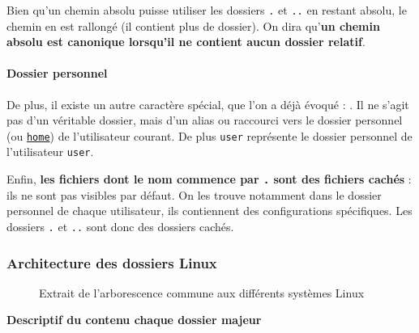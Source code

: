  Bien qu'un chemin absolu puisse utiliser les dossiers \texttt{.} et \texttt{..} en restant absolu, le chemin en est rallongé (il contient plus de dossier). On dira qu'\textbf{un chemin absolu est canonique lorsqu'il ne contient aucun dossier relatif}.

\paragraph{Dossier personnel}

De plus, il existe un autre caractère spécial, que l'on a déjà évoqué : \texttt{\tilde}. Il ne s'agit pas d'un véritable dossier, mais d'un alias ou raccourci vers le dossier personnel (ou \hyperref[sec:dirhome]{\texttt{home}}) de l'utilisateur courant. De plus \texttt{\tilde user} représente le dossier personnel de l'utilisateur \texttt{user}.

Enfin, \textbf{les fichiers dont le nom commence par \texttt{.} sont des fichiers cachés} : ils ne sont pas visibles par défaut. On les trouve notamment dans le dossier personnel de chaque utilisateur, ils contiennent des configurations spécifiques. Les dossiers \texttt{.} et \texttt{..} sont donc des dossiers cachés.

\newpage
\subsubsection{Architecture des dossiers Linux}

\begin{figure}[hb!]
    \centering
{}
    \caption{Extrait de l'arborescence commune aux différents systèmes Linux}
    \label{fig:linux_tree}
\end{figure}


\textbf{Descriptif du contenu chaque dossier majeur}

